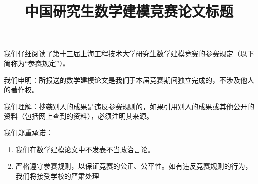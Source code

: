 \documentclass[bwprint]{suesmcmthesis}
\title{中国研究生数学建模竞赛论文标题}
\numberwithin{figure}{section}
\begin{document}
    \begin{center}
        
        \vskip0.25cm
        
    \end{center}
    \begin{flushleft}
        \setlength{\baselineskip}{1.2\baselineskip}

        \hspace{2em}我们仔细阅读了第十三届上海工程技术大学研究生数学建模竞赛的参赛规定（以下简称为“参赛规定”）。

        \hspace{2em}我们申明：所报送的数学建模论文是我们于本届竞赛期间独立完成的，不涉及他人的著作权。

        \hspace{2em}我们理解：抄袭别人的成果是违反参赛规则的，如果引用别人的成果或其他公开的资料（包括网上查到的资料），必须注明其来源。

        \hspace{2em}我们郑重承诺：
        \begin{enumerate}[label=(\arabic*)]
            \item 我们在数学建模论文中不发表不当政治言论。
            \item 严格遵守参赛规则，以保证竞赛的公正、公平性。如有违反竞赛规则的行为，我们将接受学校的严肃处理
        \end{enumerate}
    \end{flushleft}

    \vskip1.0cm
\end{document}

